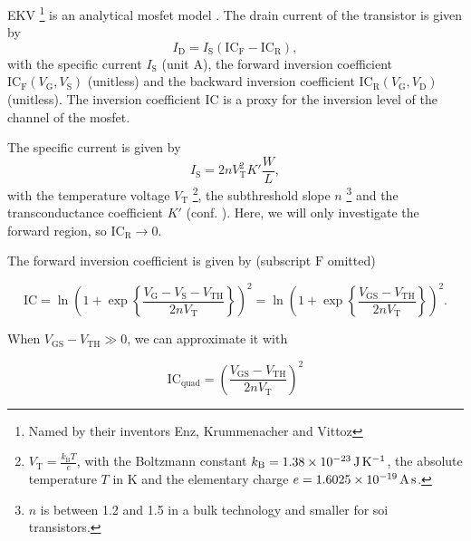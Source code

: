 \documentclass{article}[11pt]
\begin{document}
\notetitle

EKV%
\footnote{Named by their inventors Enz, Krummenacher and Vittoz}
is an analytical \gls{mosfet} model \cite{enz-ekv-90,enz-ekvstory-08}.
The drain current of the transistor is given by
\begin{equation}
I_{\mathrm{D}} = I_{\mathrm{S}} \left(\mathrm{IC}_{\mathrm{F}}-\mathrm{IC}_{\mathrm{R}}\right),
\end{equation}
with the specific current $I_{\mathrm{S}}$ (unit A), the forward 
inversion coefficient 
$\mathrm{IC}_{\mathrm{F}}(V_{\mathrm{G}}, V_{\mathrm{S}})$ (unitless) and 
the backward inversion coefficient 
$\mathrm{IC}_{\mathrm{R}}(V_{\mathrm{G}}, V_{\mathrm{D}})$ (unitless).
The inversion coefficient $\mathrm{IC}$ is a proxy for the inversion level of 
the channel of the \gls{mosfet}.

\medskip

The specific current is given by
\begin{equation}
  I_{\mathrm{S}} = 2 n V_{\mathrm{T}}^2 K' \frac{W}{L},
\end{equation}
with the temperature voltage $V_{\mathrm{T}}$%
\footnote{$V_{\mathrm{T}}=\frac{k_{\mathrm{B}} T }{e}$, with the 
Boltzmann constant $k_{\mathrm{B}}=\SI{1.38d-23}{\joule\per\kelvin}$, 
the absolute temperature $T$ in \si{\kelvin} and the 
elementary charge $e=\SI{1.6025d-19}{\ampere\second}$.},
the subthreshold slope $n$%
\footnote{$n$ is between 1.2 and 1.5 in a bulk technology and smaller 
for \gls{soi} transistors\cite{jespers-gmid-17}.}
 and the transconductance coefficient $K'$ 
(conf. \cite{mosfet-square-law}).
Here, we will only investigate the forward region, so 
$\mathrm{IC}_{\mathrm{R}} \rightarrow 0$.

\bigskip

The forward inversion coefficient is given by 
(subscript $\mathrm{F}$ omitted)

\begin{equation}\label{eq:ic}
  \mathrm{IC} = \ln\left(1+\exp\left\{\frac{V_{\mathrm{G}}-V_{\mathrm{S}}-V_{\mathrm{TH}}}{2 n V_{\mathrm{T}}}\right\}\right)^2
              = \ln\left(1+\exp\left\{\frac{V_{\mathrm{GS}}-V_{\mathrm{TH}}}{2 n V_{\mathrm{T}}}\right\}\right)^2.
\end{equation}


When $V_{\mathrm{GS}}-V_{\mathrm{TH}} \gg 0$, we can approximate 
it with

\begin{equation}\label{eq:ic-quad}
  \mathrm{IC}_{\mathrm{quad}} = \left(\frac{V_{\mathrm{GS}}-V_{\mathrm{TH}}}{2 n V_{\mathrm{T}}}\right)^2
\end{equation}
\end{document}
